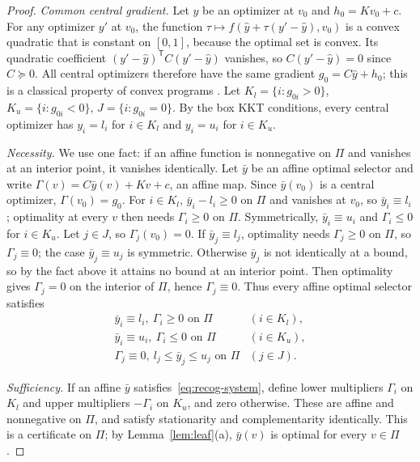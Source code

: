 \begin{proof}
\emph{Common central gradient.} Let $\hat y$ be an optimizer at $v_0$ and
$h_0=Kv_0+c$. For any optimizer $y'$ at $v_0$, the function
$\tau\mapsto f(\hat y+\tau(y'-\hat y),v_0)$ is a convex quadratic that is
constant on $[0,1]$, because the optimal set is convex. Its quadratic
coefficient $(y'-\hat y)^{\mathsf T}C(y'-\hat y)$ vanishes, so $C(y'-\hat y)=0$
since $C\succeq0$. All central optimizers therefore have the same gradient
$g_0=C\hat y+h_0$; this is a classical property of convex programs
\cite{Mangasarian1988}. Let $K_l=\{i:g_{0i}>0\}$, $K_u=\{i:g_{0i}<0\}$,
$J=\{i:g_{0i}=0\}$. By the box KKT conditions, every central optimizer has
$y_i=l_i$ for $i\in K_l$ and $y_i=u_i$ for $i\in K_u$.

\emph{Necessity.} We use one fact: if an affine function is nonnegative on
$\Pi$ and vanishes at an interior point, it vanishes identically. Let
$\bar y$ be an affine optimal selector and write
$\Gamma(v)=C\bar y(v)+Kv+c$, an affine map. Since $\bar y(v_0)$ is a central
optimizer, $\Gamma(v_0)=g_0$. For $i\in K_l$, $\bar y_i-l_i\ge0$ on $\Pi$ and
vanishes at $v_0$, so $\bar y_i\equiv l_i$; optimality at every $v$ then needs
$\Gamma_i\ge0$ on $\Pi$. Symmetrically, $\bar y_i\equiv u_i$ and $\Gamma_i\le0$
for $i\in K_u$. Let $j\in J$, so $\Gamma_j(v_0)=0$. If $\bar y_j\equiv l_j$,
optimality needs $\Gamma_j\ge0$ on $\Pi$, so $\Gamma_j\equiv0$; the case
$\bar y_j\equiv u_j$ is symmetric. Otherwise $\bar y_j$ is not identically at a
bound, so by the fact above it attains no bound at an interior point. Then
optimality gives $\Gamma_j=0$ on the interior of $\Pi$, hence
$\Gamma_j\equiv0$. Thus every affine optimal selector satisfies
\begin{equation}\label{eq:recog-system}
\begin{array}{ll}
\bar y_i\equiv l_i,\ \Gamma_i\ge0\text{ on }\Pi & (i\in K_l),\\
\bar y_i\equiv u_i,\ \Gamma_i\le0\text{ on }\Pi & (i\in K_u),\\
\Gamma_j\equiv0,\ l_j\le\bar y_j\le u_j\text{ on }\Pi & (j\in J).
\end{array}
\end{equation}

\emph{Sufficiency.} If an affine $\bar y$ satisfies~\eqref{eq:recog-system},
define lower multipliers $\Gamma_i$ on $K_l$ and upper multipliers $-\Gamma_i$ on
$K_u$, and zero otherwise. These are affine and nonnegative on $\Pi$, and
satisfy stationarity and complementarity identically. This is a certificate
on $\Pi$; by Lemma~\ref{lem:leaf}(a), $\bar y(v)$ is optimal for every
$v\in\Pi$.


\end{proof}
